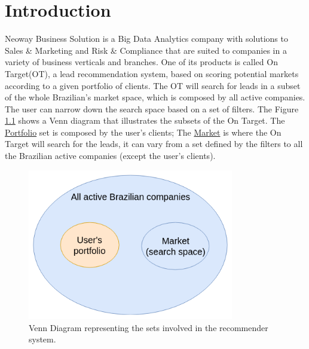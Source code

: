 \chapter{Introduction} 
\label{ch:introduction}

\fancyhead[ER]{\sffamily\footnotesize{\leftmark}}
\fancyhead[OL]{\sffamily\footnotesize{\rightmark}}

Neoway Business Solution is a Big Data Analytics company with solutions to Sales \& Marketing and Risk \& Compliance that are suited to companies in a variety of business verticals and branches. One of its products is called On Target(OT), a lead recommendation system, based on scoring potential markets according to a given portfolio of clients. The OT will search for leads in a subset of the whole Brazilian's market space, which is composed by all active companies. The user can narrow down the search space based on a set of filters. The Figure \ref{fig:braz-comps-venn-diagram} shows a Venn diagram that illustrates the subsets of the On Target. The \underline{Portfolio} set is composed by the user's clients; The \underline{Market} is where the On Target will search for the leads, it can vary from a set defined by the filters to all the Brazilian active companies (except the user's clients).

\begin{figure}[!ht]
   \centering
   \includegraphics[width=9cm]{fig/ch1-brazil-comps-venn-diagram.png}
   \caption{Venn Diagram representing the sets involved in the recommender system.}
   \label{fig:braz-comps-venn-diagram}
\end{figure}

